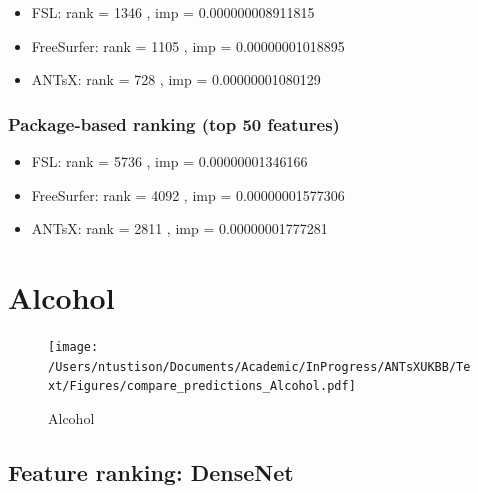 \documentclass[
  10pt,
]{article}
\begin{document}
\begin{itemize}
\item
  FSL: rank = 1346 , imp = 0.000000008911815
\item
  FreeSurfer: rank = 1105 , imp = 0.00000001018895
\item
  ANTsX: rank = 728 , imp = 0.00000001080129
\end{itemize}

\hypertarget{package-based-ranking-top-50-features-10}{%
\subsubsection{Package-based ranking (top 50
features)}\label{package-based-ranking-top-50-features-10}}

\begin{itemize}
\item
  FSL: rank = 5736 , imp = 0.00000001346166
\item
  FreeSurfer: rank = 4092 , imp = 0.00000001577306
\item
  ANTsX: rank = 2811 , imp = 0.00000001777281
\end{itemize}

\clearpage

\hypertarget{alcohol}{%
\section{Alcohol}\label{alcohol}}

\begin{figure}
\centering
\texttt{[image: /Users/ntustison/Documents/Academic/InProgress/ANTsXUKBB/Text/Figures/compare\_predictions\_Alcohol.pdf]}
\caption{Alcohol}
\end{figure}

\hypertarget{feature-ranking-densenet-2}{%
\subsection{Feature ranking:
DenseNet}\label{feature-ranking-densenet-2}}
\end{document}
